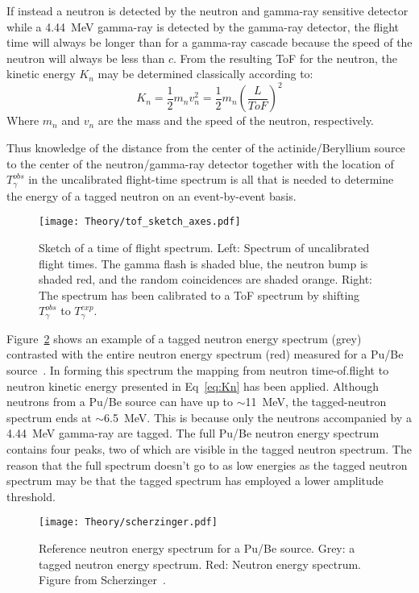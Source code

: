 \documentclass[main.tex]{subfiles}
\begin{document}
If instead a neutron is detected by the neutron and gamma-ray sensitive detector while a \SI{4.44}{\MeV} gamma-ray is detected by the gamma-ray detector, the flight time will always be longer than for a gamma-ray cascade because the speed of the neutron will always be less than $c$. From the resulting ToF for the neutron, the kinetic energy $K_n$ may be determined classically according to:
\begin{equation}
	K_n = \frac{1}{2} m_n v_n^2 = \frac{1}{2}m_n\left(\frac{L}{ToF}\right)^2
	\label{eq:Kn}
\end{equation}
Where $m_n$ and $v_n$ are the mass and the speed of the neutron, respectively.

Thus knowledge of the distance from the center of the actinide/Beryllium source to the center of the neutron/gamma-ray detector together with the location of $T_\gamma^{obs}$ in the uncalibrated flight-time spectrum is all that is needed to determine the energy of a tagged neutron on an event-by-event basis.

\begin{figure}[t]
    \centering
        \texttt{[image: Theory/tof\_sketch\_axes.pdf]}
        \caption[Sketch of a time of flight spectrum.]{Sketch of a time of flight spectrum. Left: Spectrum of uncalibrated flight times. The gamma flash is shaded blue, the neutron bump is shaded red, and the random coincidences are shaded orange. Right: The spectrum has been calibrated to a ToF spectrum by shifting $T_\gamma^{obs}$ to $T_\gamma^{exp}.$}
    \label{fig:tof_sketch} 
\end{figure}
Figure~\ref{fig:scherzinger} shows an example of a tagged neutron energy spectrum (grey) contrasted with the entire neutron energy spectrum (red) measured for a Pu/Be source~\cite{ScherzingerPhd}. In forming this spectrum the mapping from neutron time-of.flight to neutron kinetic energy presented in Eq~\ref{eq:Kn} has been applied. Although neutrons from a Pu/Be source can have up to $\sim$\SI{11}{\MeV}, the tagged-neutron spectrum ends at $\sim$\SI{6.5}{\MeV}. This is because only the neutrons accompanied by a \SI{4.44}{\MeV} gamma-ray are tagged. The full Pu/Be neutron energy spectrum contains four peaks, two of which are visible in the tagged neutron spectrum. The reason that the full spectrum doesn't go to as low energies as the tagged neutron spectrum may be that the tagged spectrum has employed a lower amplitude threshold.
\begin{figure}[b]
    \centering
        \texttt{[image: Theory/scherzinger.pdf]}
        \caption[Reference neutron energy spectrum]{Reference neutron energy spectrum for a Pu/Be source. Grey: a tagged neutron energy spectrum. Red: Neutron energy spectrum. Figure from Scherzinger~\cite{ScherzingerPhd}.}
    \label{fig:scherzinger} 
\end{figure}
\end{document}
